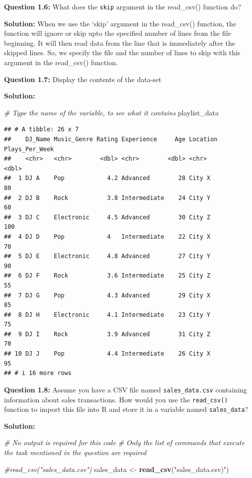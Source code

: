 \documentclass[
]{article}
\newenvironment{Shaded}{\begin{snugshade}}{\end{snugshade}}
\newcommand{\CommentTok}[1]{\textcolor[rgb]{0.56,0.35,0.01}{\textit{#1}}}
\newcommand{\FunctionTok}[1]{\textcolor[rgb]{0.13,0.29,0.53}{\textbf{#1}}}
\newcommand{\NormalTok}[1]{#1}
\newcommand{\OtherTok}[1]{\textcolor[rgb]{0.56,0.35,0.01}{#1}}
\newcommand{\StringTok}[1]{\textcolor[rgb]{0.31,0.60,0.02}{#1}}
\begin{document}
\textbf{Question 1.6:} What does the \texttt{skip} argument in the
read\_csv() function do?

\textbf{Solution:} When we use the `skip' argument in the read\_csv()
function, the function will ignore or skip upto the specified number of
lines from the file beginning. It will then read data from the line that
is immediately after the skipped lines. So, we specify the file and the
number of lines to skip with this argument in the read\_csv() function.

\textbf{Question 1.7:} Display the contents of the data-set

\textbf{Solution:}

\begin{Shaded}
\begin{Highlighting}[]
\CommentTok{\# Type the name of the variable, to see what it contains}
\NormalTok{playlist\_data}
\end{Highlighting}
\end{Shaded}

\begin{verbatim}
## # A tibble: 26 x 7
##    DJ_Name Music_Genre Rating Experience     Age Location Plays_Per_Week
##    <chr>   <chr>        <dbl> <chr>        <dbl> <chr>             <dbl>
##  1 DJ A    Pop            4.2 Advanced        28 City X               80
##  2 DJ B    Rock           3.8 Intermediate    24 City Y               60
##  3 DJ C    Electronic     4.5 Advanced        30 City Z              100
##  4 DJ D    Pop            4   Intermediate    22 City X               70
##  5 DJ E    Electronic     4.8 Advanced        27 City Y               90
##  6 DJ F    Rock           3.6 Intermediate    25 City Z               55
##  7 DJ G    Pop            4.3 Advanced        29 City X               85
##  8 DJ H    Electronic     4.1 Intermediate    23 City Y               75
##  9 DJ I    Rock           3.9 Advanced        31 City Z               70
## 10 DJ J    Pop            4.4 Intermediate    26 City X               95
## # i 16 more rows
\end{verbatim}

\textbf{Question 1.8:} Assume you have a CSV file named
\texttt{sales\_data.csv} containing information about sales
transactions. How would you use the \texttt{read\_csv()} function to
import this file into R and store it in a variable named
\texttt{sales\_data}?

\textbf{Solution:}

\begin{Shaded}
\begin{Highlighting}[]
\CommentTok{\# No output is required for this code}
\CommentTok{\# Only the list of commands that execute the task mentioned in the question are required}

\CommentTok{\#read\_csv("sales\_data.csv")}
\NormalTok{sales\_data }\OtherTok{\textless{}{-}} \FunctionTok{read\_csv}\NormalTok{(}\StringTok{"sales\_data.csv)"}\NormalTok{)}
\end{Highlighting}
\end{Shaded}
\end{document}
